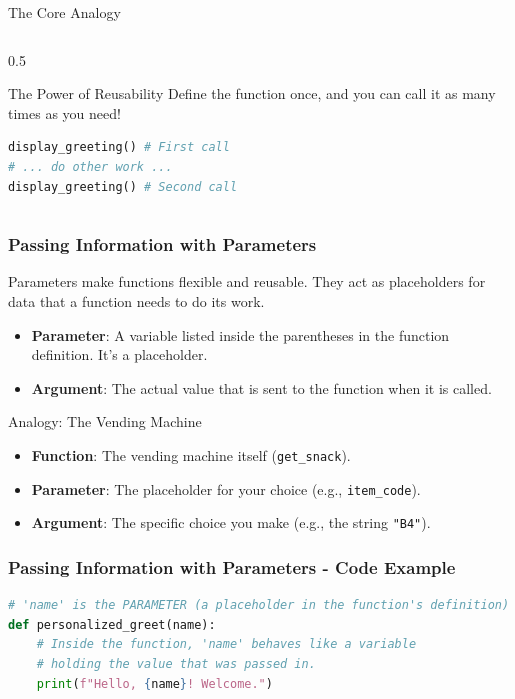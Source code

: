 \documentclass{beamer}
\begin{document}
\begin{frame}[fragile]
\begin{block}{The Core Analogy}
\begin{frame}[fragile]
\begin{columns}[T]
\begin{column}{0.5\textwidth}
            \begin{alertblock}{The Power of Reusability}
            Define the function once, and you can call it as many times as you need!
            \begin{lstlisting}[language=Python]
display_greeting() # First call
# ... do other work ...
display_greeting() # Second call
            \end{lstlisting}
            \end{alertblock}
        \end{column}
    \end{columns}
\end{frame}

\begin{frame}[fragile]
    \frametitle{Passing Information with Parameters}
    
    Parameters make functions flexible and reusable. They act as placeholders for data that a function needs to do its work.
    
    \begin{itemize}
        \item \textbf{Parameter}: A variable listed inside the parentheses in the function definition. It's a placeholder.
        \item \textbf{Argument}: The actual value that is sent to the function when it is called.
    \end{itemize}
    
    \begin{block}{Analogy: The Vending Machine}
        \begin{itemize}
            \item \textbf{Function}: The vending machine itself (\texttt{get\_snack}).
            \item \textbf{Parameter}: The placeholder for your choice (e.g., \texttt{item\_code}).
            \item \textbf{Argument}: The specific choice you make (e.g., the string \texttt{"B4"}).
        \end{itemize}
    \end{block}
    
\end{frame}

\begin{frame}[fragile]
    \frametitle{Passing Information with Parameters - Code Example}
    
    \begin{lstlisting}[language=Python]
# 'name' is the PARAMETER (a placeholder in the function's definition)
def personalized_greet(name):
    # Inside the function, 'name' behaves like a variable
    # holding the value that was passed in.
    print(f"Hello, {name}! Welcome.")


\end{lstlisting}
\end{frame}
\end{block}
\end{frame}
\end{document}
